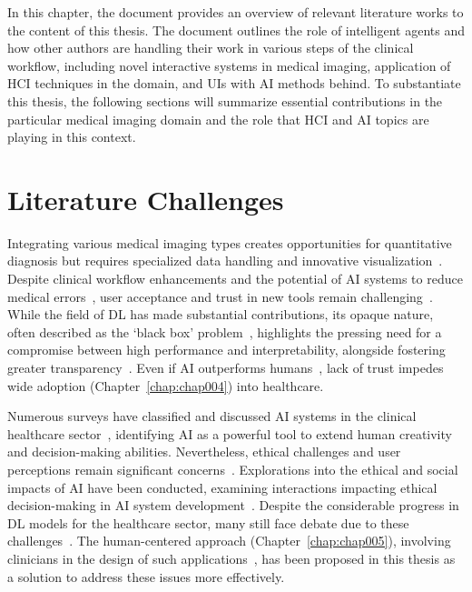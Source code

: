 \clearpage
\label{chap:chap003}

In this chapter, the document provides an overview of relevant literature works to the content of this thesis.
The document outlines the role of intelligent agents and how other authors are handling their work in various steps of the clinical workflow, including novel interactive systems in medical imaging, application of \ac{HCI} techniques in the domain, and \acp{UI} with \ac{AI} methods behind.
To substantiate this thesis, the following sections will summarize essential contributions in the particular medical imaging domain and the role that \ac{HCI} and \ac{AI} topics are playing in this context.

\section{Literature Challenges}
\label{sec:chap003001}

Integrating various medical imaging types creates opportunities for quantitative diagnosis but requires specialized data handling and innovative visualization~\cite{Igarashi:2016:IVS:2984511.2984537}.
Despite clinical workflow enhancements and the potential of \ac{AI} systems to reduce medical errors~\cite{Cai:2019:EEE:3301275.3302289}, user acceptance and trust in new tools remain challenging~\cite{https://doi.org/10.1002/mp.13562}.
While the field of \ac{DL} has made substantial contributions, its opaque nature, often described as the `black box' problem~\cite{10.1145/3306618.3314293}, highlights the pressing need for a compromise between high performance and interpretability\cite{gunning2017explainable}, alongside fostering greater transparency~\cite{10.1145/3290605.3300233}.
Even if \ac{AI} outperforms humans~\cite{McKinney2020}, lack of trust impedes wide adoption (Chapter~\ref{chap:chap004}) into healthcare.

Numerous surveys have classified and discussed \ac{AI} systems in the clinical healthcare sector~\cite{LANGER2021106878, PELAU2021106855, STADIN2021106486}, identifying \ac{AI} as a powerful tool to extend human creativity and decision-making abilities.
Nevertheless, ethical challenges and user perceptions remain significant concerns~\cite{10.1145/3311957.3361858}.
Explorations into the ethical and social impacts of \ac{AI} have been conducted, examining interactions impacting ethical decision-making in \ac{AI} system development~\cite{PARK2021106795}.
Despite the considerable progress in \ac{DL} models for the healthcare sector, many still face debate due to these challenges~\cite{McKinney2020}.
The human-centered approach (Chapter~\ref{chap:chap005}), involving clinicians in the design of such applications~\cite{CALISTO2021102607}, has been proposed in this thesis as a solution to address these issues more effectively.

